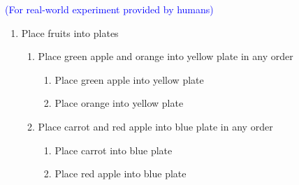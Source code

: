 \documentclass{article}
\begin{document}
 {\textcolor{blue}{(For real-world experiment provided by humans)}}
 \begin{enumerate}
 \item Place fruits into plates
     \begin{enumerate}
     \item Place green apple and orange into yellow plate in any order
         \begin{enumerate}
             \item Place green apple into yellow plate
             \item Place orange into yellow plate
         \end{enumerate}
     \item Place carrot and red apple into blue plate in any order
         \begin{enumerate}
             \item Place carrot into blue plate
             \item Place red apple into blue plate
         \end{enumerate}
     \end{enumerate}
 \end{enumerate}

\end{document}
